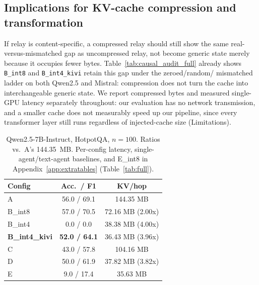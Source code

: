\documentclass[11pt]{article}
\begin{document}
\subsection{Implications for KV-cache compression and transformation}

If relay is content-specific, a compressed relay should still show the
same real-versus-mismatched gap as uncompressed relay, not become
generic state merely because it occupies fewer bytes.
Table~\ref{tab:causal_audit_full} already shows \texttt{B\_int8} and
\texttt{B\_int4\_kivi} retain this gap under the zeroed/random/
mismatched ladder on both Qwen2.5 and Mistral: compression does not
turn the cache into interchangeable generic state. We report
compressed bytes and measured single-GPU latency separately
throughout: our evaluation has no network transmission, and a smaller
cache does not measurably speed up our pipeline, since every
transformer layer still runs regardless of injected-cache size
(Limitations).

\begin{table}[t]
\centering
\small
\begin{tabular}{lcc}
\toprule
\textbf{Config} & \textbf{Acc.\ / F1} & \textbf{KV/hop} \\
\midrule
A & 56.0 / 69.1 & 144.35 MB \\
B\_int8 & 57.0 / 70.5 & 72.16 MB (2.00x) \\
B\_int4 & 0.0 / 0.0 & 38.38 MB (4.00x) \\
\textbf{B\_int4\_kivi} & \textbf{52.0 / 64.1} & 36.43 MB (3.96x) \\
C & 43.0 / 57.8 & 104.16 MB \\
D & 50.0 / 61.9 & 37.82 MB (3.82x) \\
E & 9.0 / 17.4 & 35.63 MB \\
\bottomrule
\end{tabular}
\caption{Qwen2.5-7B-Instruct, HotpotQA, $n=100$. Ratios vs.\ A's
144.35~MB. Per-config latency, single-agent/text-agent baselines, and
E\_int8 in Appendix~\ref{app:extratables} (Table~\ref{tab:full}).}
\label{tab:main}
\end{table}
\end{document}
